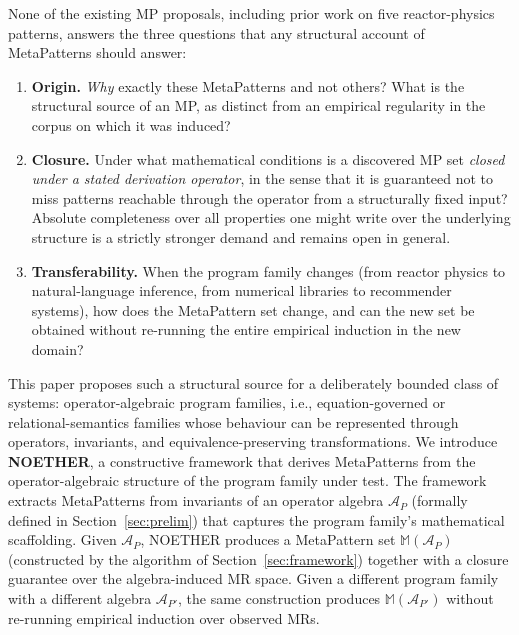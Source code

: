 \documentclass[acmsmall,screen,review]{acmart}
\begin{document}
None of the existing MP proposals, including prior work on five reactor-physics patterns, answers the three questions that any structural account of MetaPatterns should answer:

\begin{enumerate}
  \item \textbf{Origin.} \emph{Why} exactly these MetaPatterns and not others? What is the structural source of an MP, as distinct from an empirical regularity in the corpus on which it was induced?
  \item \textbf{Closure.} Under what mathematical conditions is a discovered MP set \emph{closed under a stated derivation operator}, in the sense that it is guaranteed not to miss patterns reachable through the operator from a structurally fixed input? Absolute completeness over all properties one might write over the underlying structure is a strictly stronger demand and remains open in general.
  \item \textbf{Transferability.} When the program family changes (from reactor physics to natural-language inference, from numerical libraries to recommender systems), how does the MetaPattern set change, and can the new set be obtained without re-running the entire empirical induction in the new domain?
\end{enumerate}

This paper proposes such a structural source for a deliberately bounded class of systems: operator-algebraic program families, i.e., equation-governed or relational-semantics families whose behaviour can be represented through operators, invariants, and equivalence-preserving transformations. We introduce \textbf{NOETHER}, a constructive framework that derives MetaPatterns from the operator-algebraic structure of the program family under test. The framework extracts MetaPatterns from invariants of an operator algebra $\mathcal{A}_P$ (formally defined in Section~\ref{sec:prelim}) that captures the program family's mathematical scaffolding. Given $\mathcal{A}_P$, NOETHER produces a MetaPattern set $\mathbb{M}(\mathcal{A}_P)$ (constructed by the algorithm of Section~\ref{sec:framework}) together with a closure guarantee over the algebra-induced MR space. Given a different program family with a different algebra $\mathcal{A}_{P'}$, the same construction produces $\mathbb{M}(\mathcal{A}_{P'})$ without re-running empirical induction over observed MRs.
\end{document}
